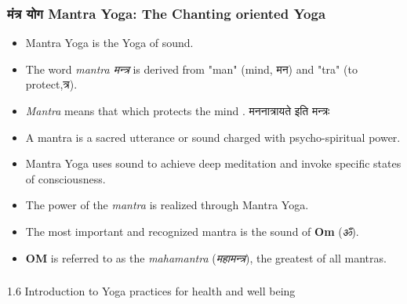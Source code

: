 \begin{frame}[fragile]\frametitle{मंत्र योग Mantra Yoga: The Chanting oriented Yoga}
    
\begin{itemize}
    \item Mantra Yoga is the Yoga of sound.
    \item The word \textit{mantra मन्त्र} is derived from "man" (mind, मन) and "tra" (to protect,त्र).
    \item \textit{Mantra} means that which protects the mind . मननात्रायते इति मन्त्रः
    \item A mantra is a sacred utterance or sound charged with psycho-spiritual power.
    \item Mantra Yoga uses sound to achieve deep meditation and invoke specific states of consciousness.
    \item The power of the \textit{mantra} is realized through Mantra Yoga.
    \item The most important and recognized mantra is the sound of \textbf{Om} (\textit{ॐ}).
    \item \textbf{OM} is referred to as the \textit{mahamantra} (\textit{महामन्त्र}), the greatest of all mantras.
\end{itemize}
    
\end{frame}



\begin{frame}[fragile]\frametitle{}
\begin{center}
{\Large 1.6 Introduction to Yoga practices for health and well being}
\end{center}
\end{frame}



